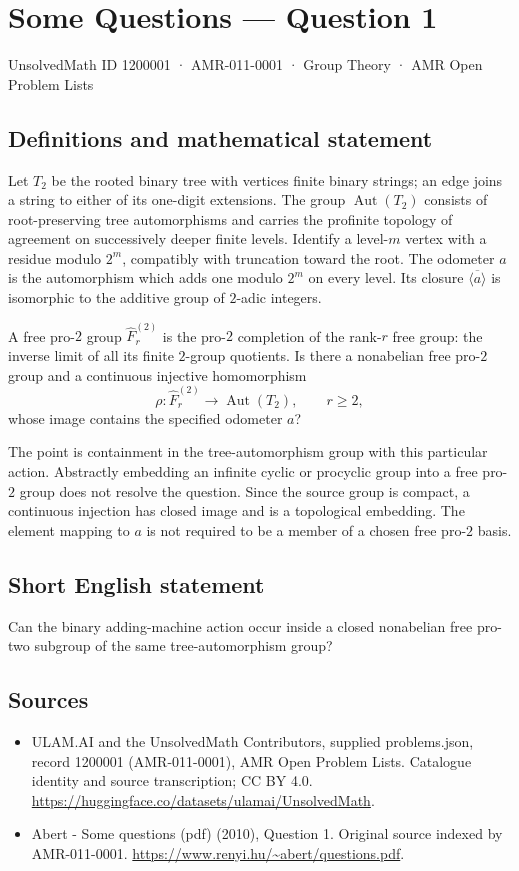 \documentclass[11pt,a4paper]{article}
\begin{document}
\section*{Some Questions — Question 1}\label{1200001}
{\small UnsolvedMath ID 1200001 · AMR-011-0001 · Group Theory · AMR Open Problem Lists}
\subsection{Definitions and mathematical statement}
Let $T_2$ be the rooted binary tree with vertices finite binary strings; an edge joins a string to either of its one-digit extensions. The group $\operatorname{Aut}(T_2)$ consists of root-preserving tree automorphisms and carries the profinite topology of agreement on successively deeper finite levels. Identify a level-$m$ vertex with a residue modulo $2^m$, compatibly with truncation toward the root. The odometer $a$ is the automorphism which adds one modulo $2^m$ on every level. Its closure $\overline{\langle a\rangle}$ is isomorphic to the additive group of $2$-adic integers.

A free pro-$2$ group $\widehat F^{(2)}_r$ is the pro-$2$ completion of the rank-$r$ free group: the inverse limit of all its finite $2$-group quotients. Is there a nonabelian free pro-$2$ group and a continuous injective homomorphism
\[
 \rho:\widehat F^{(2)}_r\longrightarrow\operatorname{Aut}(T_2),
 \qquad r\geq2,
\]
whose image contains the specified odometer $a$?

The point is containment in the tree-automorphism group with this particular action. Abstractly embedding an infinite cyclic or procyclic group into a free pro-$2$ group does not resolve the question. Since the source group is compact, a continuous injection has closed image and is a topological embedding. The element mapping to $a$ is not required to be a member of a chosen free pro-$2$ basis.
\subsection{Short English statement}
Can the binary adding-machine action occur inside a closed nonabelian free pro-two subgroup of the same tree-automorphism group?
\subsection{Sources}
\begin{itemize}
\item[S1] ULAM.AI and the UnsolvedMath Contributors, supplied problems.json, record 1200001 (AMR-011-0001), AMR Open Problem Lists. Catalogue identity and source transcription; CC BY 4.0.
\url{https://huggingface.co/datasets/ulamai/UnsolvedMath}.
\item[S2] Abert - Some questions (pdf) (2010), Question 1. Original source indexed by AMR-011-0001.
\url{https://www.renyi.hu/~abert/questions.pdf}.
\end{itemize}
\end{document}
